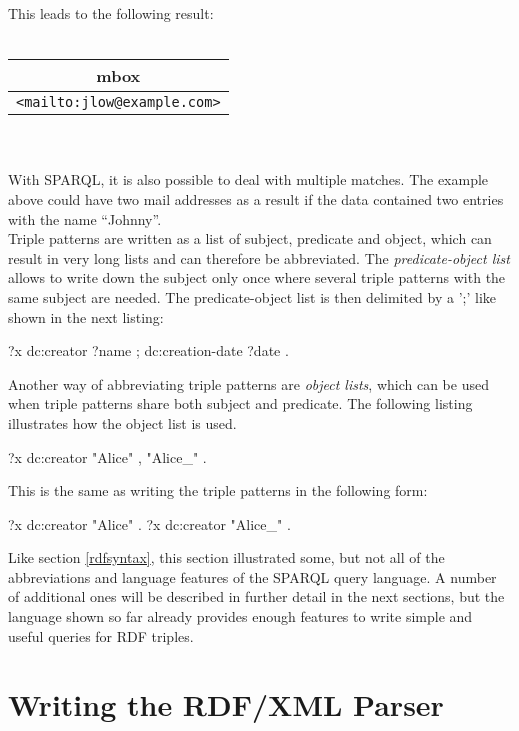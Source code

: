 \documentclass[11pt,a4paper,headsepline, bibtotoc]{scrreprt}
\begin{document}
$$This leads to the following result:\\ \\
\begin{tabular}[c]{|c|}\hline
{\sf\bf mbox} \\ \hline
{\tt <mailto:jlow@example.com>}\\ \hline
\end{tabular}\\ \\
With SPARQL, it is also possible to deal with multiple matches. The example above could have two mail addresses as a result if the data contained two entries with the name ``Johnny''.\\
Triple patterns are written as a list of subject, predicate and object, which can result in very long lists and can therefore be abbreviated. The \textit{predicate-object list} allows to write down the subject only once where several triple patterns with the same subject are needed. The predicate-object list is then delimited by a ';' like shown in the next listing:
\begin{blank} 
?x  dc:creator          ?name ;
    dc:creation-date     ?date .
\end{blank}
Another way of abbreviating triple patterns are \textit{object lists}, which can be used when triple patterns share both subject and predicate. The following listing illustrates how the object list is used.
\begin{blank} 
?x  dc:creator  "Alice" , "Alice_" .
\end{blank}
This is the same as writing the triple patterns in the following form:
\begin{blank} 
?x  dc:creator  "Alice" .
?x  dc:creator  "Alice_" .
\end{blank}

Like section \ref{rdfsyntax}, this section illustrated some, but not all of the abbreviations and language features of the SPARQL query language. A number of additional ones will be described in further detail in the next sections, but the language shown so far already provides enough features to write simple and useful queries for RDF triples.
  
\section{Writing the RDF/XML Parser} \label{rdfparser}
\end{document}
